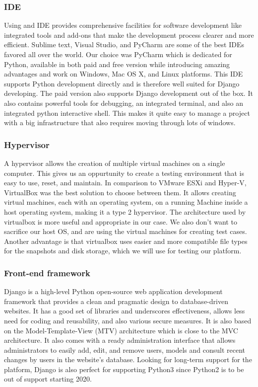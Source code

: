 \subsubsection{IDE}
Using and IDE provides comprehensive facilities for software development like integrated tools and add-ons that make the development process clearer and more efficient. Sublime text, Visual Studio, and PyCharm are some of the best IDEs favored all over the world. Our choice was PyCharm\cite{pycharm} which is dedicated for Python, available in both paid and free version while introducing amazing advantages and work on Windows, Mac OS X, and Linux platforms. This IDE supports Python development directly and is therefore well suited for Django developing. The paid version also supports Django development out of the box. It also contains powerful tools for debugging, an integrated terminal, and also an integrated python interactive shell. This makes it quite easy to manage a project with a big infrastructure that also requires moving through lots of windows.

\subsubsection{Hypervisor}
A hypervisor allows the creation of multiple virtual machines on a single computer. This gives us an oppurtunity to create a testing environment that is easy to use, reset, and maintain. In comparison to VMware ESXi and Hyper-V, VirtualBox\cite{virtualbox} was the best solution to choose between them. It allows creating virtual machines, each with an operating system, on a running Machine inside a host operating system, making it a type 2 hypervisor. The architecture used by virtualbox is more useful and appropriate in our case. We also don't want to sacrifice our host OS, and are using the virtual machines for creating test cases. Another advantage is that virtualbox uses easier and more compatible file types for the snapshots and disk storage, which we will use for testing our platform.

\subsubsection{Front-end framework}
Django is a high-level Python open-source web application development framework that provides a clean and pragmatic design to database-driven websites. It has a good set of libraries and underscores effectiveness, allows less need for coding and reusability, and also various secure measures. It is also based on the Model-Template-View (MTV) architecture which is close to the MVC architecture. It also comes with a ready administration interface that allows administrators to easily add, edit, and remove users, models and consult recent changes by users in the website's database. Looking for long-term support for the platform, Django is also perfect for supporting Python3 since Python2 is to be out of support starting 2020.


